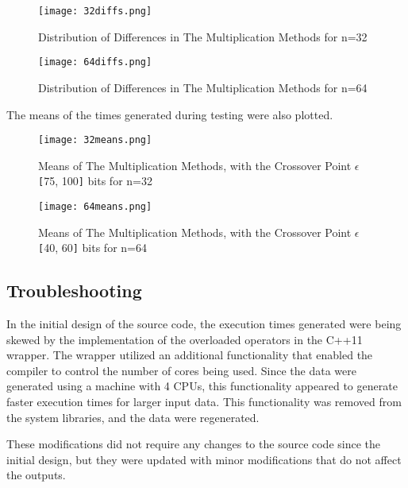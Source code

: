 \documentclass[usletter, 12pt]{article}
\begin{document}
        \begin{figure}[ht]
            \begin{center}
                \texttt{[image: 32diffs.png]}
                \caption{Distribution of Differences in The Multiplication Methods for n=32} \label{32diffs}
            \end{center}
        \end{figure}

        \begin{figure}[ht]
            \begin{center}
                \texttt{[image: 64diffs.png]}
                \caption{Distribution of Differences in The Multiplication Methods for n=64} \label{64diffs}
            \end{center}
        \end{figure}
        \clearpage
        \newpage

        The means of the times generated during testing were also plotted.
        \begin{figure}[ht]
            \begin{center}
                \texttt{[image: 32means.png]}
                \caption{Means of The Multiplication Methods, with the Crossover Point $\epsilon$\texttt{[}75, 100\texttt{]} bits for n=32} \label{32diffs}
            \end{center}
        \end{figure}

        \begin{figure}[ht]
            \begin{center}
                \texttt{[image: 64means.png]}
                \caption{Means of The Multiplication Methods, with the Crossover Point $\epsilon$\texttt{[}40, 60\texttt{]} bits for n=64} \label{64diffs}
            \end{center}
        \end{figure}

        \subsection{Troubleshooting}
        In the initial design of the source code, the execution times generated were being skewed by the implementation of the overloaded operators in the C++11 wrapper. The wrapper utilized an additional functionality that enabled the compiler to control the number of cores being used. Since the data were generated using a machine with 4 CPUs, this functionality appeared to generate faster execution times for larger input data. This functionality was removed from the system libraries, and the data were regenerated.

        These modifications did not require any changes to the source code since the initial design, but they were updated with minor modifications that do not affect the outputs.
\end{document}
